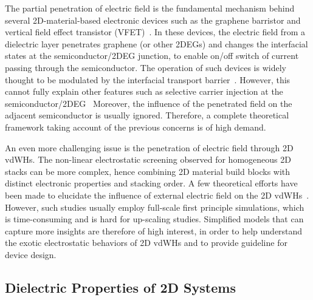The partial penetration of electric field is
the fundamental mechanism behind several 2D-material-based electronic
devices such as the graphene barristor and vertical field effect
transistor (VFET)~\autocite{Yang_2012_Barristor,Shih_2015_PartiallyScreened}.
%
In these devices, the electric field from a dielectric layer
penetrates graphene (or other 2DEGs) and changes the interfacial
states at the semiconductor/2DEG junction, to enable on/off switch of
current passing through the semiconductor.
%
The operation of such devices is widely thought to be
modulated by the interfacial transport
barrier~\autocite{Yang_2012_Barristor,Zhong_2014_SB,Dankert_2017_graphene_spin_SB}.
However, this cannot fully explain other features such as
selective carrier injection at the
semiconductor/\allowbreak{}2DEG~\autocite{Shih_2015_PartiallyScreened}
%
Moreover, the influence of the penetrated field on the adjacent
semiconductor is usually ignored.
%
Therefore, a complete theoretical framework taking account of the
previous concerns is of high demand.

An even more challenging issue is the penetration of electric field
through 2D vdWHs. The non-linear electrostatic screening observed for
homogeneous 2D stacks can be more complex, hence combining 2D material
build blocks with distinct electronic properties and stacking order.
%
A few theoretical efforts have been made to elucidate the influence of
external electric field on the 2D
vdWHs~\autocite{Santos_2013_tunable_eps_gr,Santos_2013_ACSnano_kaxi,Lu_2017_ami_electro_doping}.
%
However, such studies usually employ full-scale first principle
simulations, which is time-consuming and is hard for up-scaling
studies.
%
Simplified models that can capture more insights are therefore of high
interest, in order to help understand the exotic electrostatic behaviors of 2D
vdWHs and to provide guideline for device design.


\subsection{Dielectric Properties of 2D Systems}
\label{sec:diel-prop-2d}

